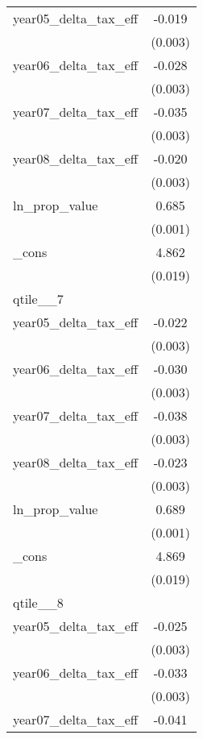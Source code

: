 {\begin{tabular}{l*{1}{c}}
year05\_delta\_tax\_eff&      -0.019\sym{***}\\
            &     (0.003)         \\
[1em]
year06\_delta\_tax\_eff&      -0.028\sym{***}\\
            &     (0.003)         \\
[1em]
year07\_delta\_tax\_eff&      -0.035\sym{***}\\
            &     (0.003)         \\
[1em]
year08\_delta\_tax\_eff&      -0.020\sym{***}\\
            &     (0.003)         \\
[1em]
ln\_prop\_value&       0.685\sym{***}\\
            &     (0.001)         \\
[1em]
\_cons      &       4.862\sym{***}\\
            &     (0.019)         \\
\hline
qtile\_\_7    &                     \\
year05\_delta\_tax\_eff&      -0.022\sym{***}\\
            &     (0.003)         \\
[1em]
year06\_delta\_tax\_eff&      -0.030\sym{***}\\
            &     (0.003)         \\
[1em]
year07\_delta\_tax\_eff&      -0.038\sym{***}\\
            &     (0.003)         \\
[1em]
year08\_delta\_tax\_eff&      -0.023\sym{***}\\
            &     (0.003)         \\
[1em]
ln\_prop\_value&       0.689\sym{***}\\
            &     (0.001)         \\
[1em]
\_cons      &       4.869\sym{***}\\
            &     (0.019)         \\
\hline
qtile\_\_8    &                     \\
year05\_delta\_tax\_eff&      -0.025\sym{***}\\
            &     (0.003)         \\
[1em]
year06\_delta\_tax\_eff&      -0.033\sym{***}\\
            &     (0.003)         \\
[1em]
year07\_delta\_tax\_eff&      -0.041\sym{***}\\

\end{tabular}}
